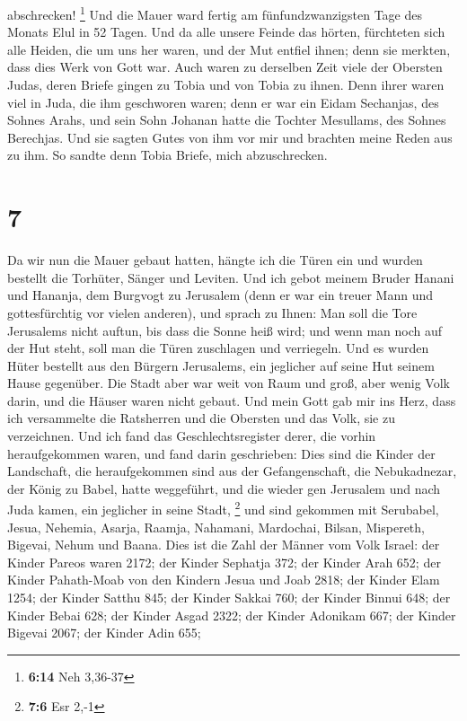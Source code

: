 abschrecken! \footnote{\textbf{6:14} Neh 3,36-37}  Und
die Mauer ward fertig am fünfundzwanzigsten Tage des Monats Elul in 52
Tagen.  Und da alle unsere Feinde das hörten, fürchteten
sich alle Heiden, die um uns her waren, und der Mut entfiel ihnen; denn
sie merkten, dass dies Werk von Gott war.  Auch waren zu
derselben Zeit viele der Obersten Judas, deren Briefe gingen zu Tobia
und von Tobia zu ihnen.  Denn ihrer waren viel in Juda,
die ihm geschworen waren; denn er war ein Eidam Sechanjas, des Sohnes
Arahs, und sein Sohn Johanan hatte die Tochter Mesullams, des Sohnes
Berechjas.  Und sie sagten Gutes von ihm vor mir und
brachten meine Reden aus zu ihm. So sandte denn Tobia Briefe, mich
abzuschrecken.

\hypertarget{section-6}{%
\section{7}\label{section-6}}

 Da wir nun die Mauer gebaut hatten, hängte ich die Türen
ein und wurden bestellt die Torhüter, Sänger und Leviten. 
Und ich gebot meinem Bruder Hanani und Hananja, dem Burgvogt zu
Jerusalem (denn er war ein treuer Mann und gottesfürchtig vor vielen
anderen),  und sprach zu Ihnen: Man soll die Tore
Jerusalems nicht auftun, bis dass die Sonne heiß wird; und wenn man noch
auf der Hut steht, soll man die Türen zuschlagen und verriegeln. Und es
wurden Hüter bestellt aus den Bürgern Jerusalems, ein jeglicher auf
seine Hut seinem Hause gegenüber.  Die Stadt aber war weit
von Raum und groß, aber wenig Volk darin, und die Häuser waren nicht
gebaut.  Und mein Gott gab mir ins Herz, dass ich
versammelte die Ratsherren und die Obersten und das Volk, sie zu
verzeichnen. Und ich fand das Geschlechtsregister derer, die vorhin
heraufgekommen waren, und fand darin geschrieben:  Dies
sind die Kinder der Landschaft, die heraufgekommen sind aus der
Gefangenschaft, die Nebukadnezar, der König zu Babel, hatte weggeführt,
und die wieder gen Jerusalem und nach Juda kamen, ein jeglicher in seine
Stadt, \footnote{\textbf{7:6} Esr 2,-1}  und sind gekommen
mit Serubabel, Jesua, Nehemia, Asarja, Raamja, Nahamani, Mardochai,
Bilsan, Mispereth, Bigevai, Nehum und Baana. Dies ist die Zahl der
Männer vom Volk Israel:  der Kinder Pareos waren 2172;
 der Kinder Sephatja 372;  der Kinder Arah
652;  der Kinder Pahath-Moab von den Kindern Jesua und
Joab 2818;  der Kinder Elam 1254;  der
Kinder Satthu 845;  der Kinder Sakkai 760;
 der Kinder Binnui 648;  der Kinder Bebai
628;  der Kinder Asgad 2322;  der Kinder
Adonikam 667;  der Kinder Bigevai 2067; 
der Kinder Adin 655;

